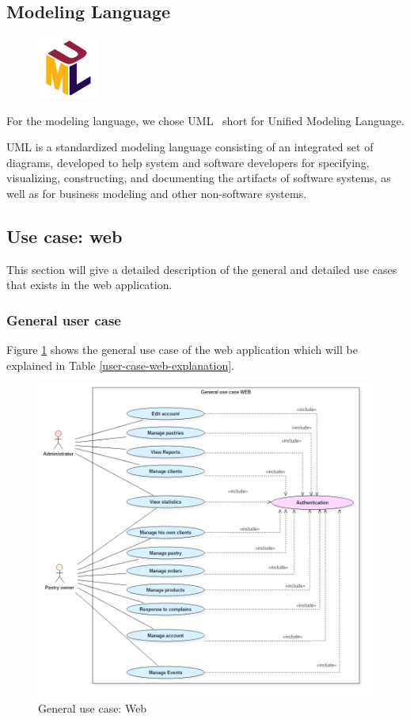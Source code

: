 \documentclass[12pt,a4paper]{report}
\begin{document}
	\subsection{Modeling Language}
	\begin{figure}
		\centering
		\includegraphics[width=0.8in]{uml.png}
	\end{figure}
	For the modeling language, we chose UML~\cite{fowler2004uml} short for Unified Modeling Language.\par
	UML is a standardized modeling language consisting of an integrated set of diagrams, developed to help system and software developers for specifying, visualizing, constructing, and documenting the artifacts of software systems, as well as for business modeling and other non-software systems.
	
	\subsection{Use case: web}
	This section will give a detailed description of the general and detailed use cases that exists in the web application.
		\subsubsection{General user case}
		 Figure \ref{user-case-web} shows the general use case of the web application which will be explained in Table \ref{user-case-web-explanation}.
			\begin{figure}[H]
				\vspace*{3cm}

				\centering
				\includegraphics[width=7in,keepaspectratio]{usecaseWeb.png}
				\caption{General use case: Web}
				\label{user-case-web}
			\end{figure}
		
\end{document}
